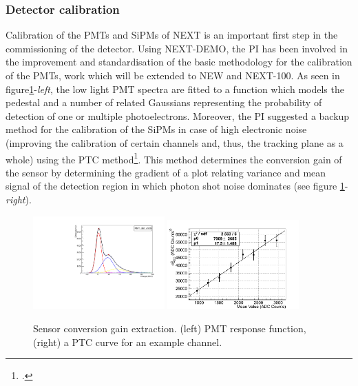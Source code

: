 \documentclass[a4paper,11pt,oneside]{article}
\begin{document}
\subsubsection*{Detector calibration}
Calibration of the PMTs and SiPMs of NEXT is an important first step
in the commissioning of the detector. Using NEXT-DEMO, the PI has been
involved in the improvement and standardisation of the basic
methodology for the calibration of the PMTs, work which will be
extended to NEW and NEXT-100. As seen in figure\ref{fig:cal}-\emph{left}, the low light
PMT spectra are fitted to a function which models the pedestal and a
number of related Gaussians representing the probability of detection
of one or multiple photoelectrons. Moreover, the PI suggested a backup
method for the calibration of the SiPMs in case of high electronic
noise (improving the calibration of certain channels and, thus, the
tracking plane as a whole) using the PTC
method\footcite{Janesick:2001}. This method determines the conversion
gain of the sensor by determining the gradient of a plot relating
variance and mean signal of the detection region
in which photon shot noise dominates (see figure \ref{fig:cal}-\emph{right}).
\begin{figure}
  \begin{center}
    \includegraphics[width=0.45\textwidth]{img/pmtFitEx}
    \includegraphics[width=0.45\textwidth]{img/Silinfit.png}
  \end{center}
  \caption{Sensor conversion gain extraction. (left) PMT response
    function, (right) a PTC curve for an example channel.}
  \label{fig:cal}
\end{figure}
\end{document}

